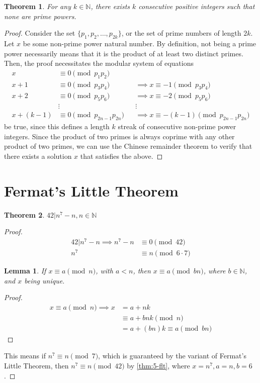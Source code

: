 \documentclass{article}
\newtheorem{theorem}{Theorem}
\newtheorem{lemma}{Lemma}
\newcommand{\N}{\mathbb{N}}
\begin{document}
\begin{theorem}
    For any \(k \in \N\), there exists \(k\) consecutive positive integers such that none are prime powers.
\end{theorem}
\begin{proof}
    Consider the set \(\{p_1, p_2, \ldots, p_{2k}\}\), or the set of prime numbers of length \(2k\).
    Let \(x\) be some non-prime power natural number.
    By definition, not being a prime power necessarily means that it is the product of at least two distinct primes.
    Then, the proof necessitates the modular system of equations
    \begin{align}
        x &\equiv 0 \pmod{p_1 p_2} \\
        x + 1 &\equiv 0 \pmod{p_3 p_4} &&\implies x \equiv -1 \pmod{p_3 p_4} \\
        x + 2 &\equiv 0 \pmod{p_5 p_6} &&\implies x \equiv -2 \pmod{p_5 p_6} \\
       &\vdots &&\vdots \\
        x + (k - 1) &\equiv 0 \pmod{p_{2n - 1} p_{2n}} &&\implies x \equiv -(k - 1) \pmod{p_{2n - 1} p_{2n}}
    \end{align}
    be true, since this defines a length \(k\) streak of consecutive non-prime power integers.
    Since the product of two primes is always coprime with any other product of two primes, we can use the Chinese remainder theorem to verify that there exists a solution \(x\) that satisfies the above.
\end{proof}

\section{Fermat's Little Theorem}

\begin{theorem}
    \(42 | n^7 - n, n \in \N\)
\end{theorem}
\begin{proof}
    \begin{align}
        42 | n^7 - n \implies n^7 - n &\equiv 0 \pmod{42} \\
        n^7 &\equiv n \pmod{6 \cdot 7}
    \end{align}
    \begin{lemma}
        If \(x \equiv a \pmod{n}\), with \(a < n\), then \(x \equiv a \pmod{b n}\), where \(b \in \N\), and \(x\) being unique.
    \end{lemma} \label{thm:5-flt}
    \begin{proof}
        \begin{align}
            x \equiv a \pmod{n} \implies x &= a + nk \\
            &\equiv a + bnk \pmod{n} \\
            &= a + (bn)k \equiv a \pmod{bn}
        \end{align}
    \end{proof}
    This means if \(n^7 \equiv n \pmod{7}\), which is guaranteed by the variant of Fermat's Little Theorem, then \(n^7 \equiv n \pmod{42}\) by \autoref{thm:5-flt}, where \(x = n^7, a = n, b = 6\).
\end{proof}
\end{document}
